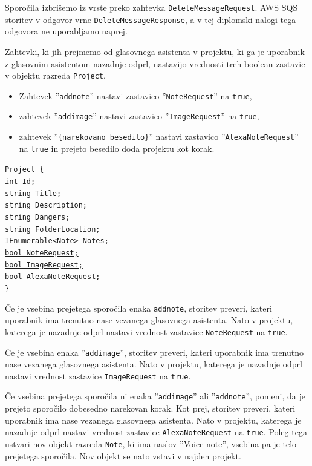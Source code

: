 \documentclass[a4paper, 12pt]{book}
\begin{document}
Sporočila izbrišemo iz vrste preko zahtevka \texttt{DeleteMessageRequest}.
AWS SQS storitev v odgovor vrne \texttt{DeleteMessageResponse}, a v tej diplomski nalogi tega odgovora ne uporabljamo naprej.

Zahtevki, ki jih prejmemo od glasovnega asistenta v projektu, ki ga je uporabnik z glasovnim asistentom nazadnje odprl, nastavijo vrednosti treh boolean zastavic v objektu razreda \texttt{Project}.
\begin{itemize}
	\item Zahtevek ''\texttt{addnote}'' nastavi zastavico ''\texttt{NoteRequest}'' na \texttt{true},
	\item zahtevek ''\texttt{addimage}'' nastavi zastavico ''\texttt{ImageRequest}'' na \texttt{true},
	\item zahtevek ''\texttt{\{narekovano besedilo\}}'' nastavi zastavico ''\texttt{AlexaNoteRequest}'' na \texttt{true} in prejeto besedilo doda projektu kot korak.
\end{itemize}

\noindent \texttt{Project \{ \\
int Id; \\
string Title; \\
string Description; \\
string Dangers; \\
string FolderLocation; \\
IEnumerable<Note> Notes; \\
\underline{bool NoteRequest;} \\
\underline{bool ImageRequest;} \\
\underline{bool AlexaNoteRequest;} \\
\}
}



Če je vsebina prejetega sporočila enaka \texttt{addnote}, storitev preveri, kateri uporabnik ima trenutno nase vezanega glasovnega asistenta.
Nato v projektu, katerega je nazadnje odprl nastavi vrednost zastavice \texttt{NoteRequest} na \texttt{true}.


Če je vsebina enaka ''\texttt{addimage}'', storitev preveri, kateri uporabnik ima trenutno nase vezanega glasovnega asistenta.
Nato v projektu, katerega je nazadnje odprl nastavi vrednost zastavice \texttt{ImageRequest} na \texttt{true}.

Če vsebina prejetega sporočila ni enaka ''\texttt{addimage}'' ali ''\texttt{addnote}'', pomeni, da je prejeto sporočilo dobesedno narekovan korak.
Kot prej, storitev preveri, kateri uporabnik ima nase vezanega glasovnega asistenta.
Nato v projektu, katerega je nazadnje odprl nastavi vrednost zastavice \texttt{AlexaNoteRequest} na \texttt{true}.
Poleg tega ustvari nov objekt razreda \texttt{Note}, ki ima naslov ''Voice note'', vsebina pa je telo prejetega sporočila.
Nov objekt se nato vstavi v najden projekt.
\end{document}
